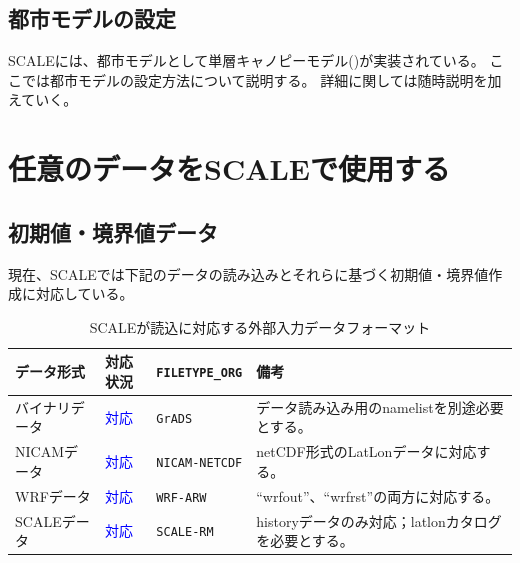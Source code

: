 \subsection{都市モデルの設定} \label{sec:adv_urban}
SCALEには、都市モデルとして単層キャノピーモデル(\cite{kusaka_2001})が実装されている。
ここでは都市モデルの設定方法について説明する。
詳細に関しては随時説明を加えていく。


\section{任意のデータをSCALEで使用する} \label{sec:adv_datainput}





\subsection{初期値・境界値データ} \label{sec:adv_bnddata}
現在、SCALEでは下記のデータの読み込みとそれらに基づく初期値・境界値作成に対応している。

\begin{table}[htb]
\begin{center}
\caption{SCALEが読込に対応する外部入力データフォーマット}
\begin{tabularx}{150mm}{|l|l|l|X|} \hline
 \rowcolor[gray]{0.9} データ形式 & 対応状況 & \verb|FILETYPE_ORG| & 備考 \\ \hline
 バイナリデータ & \textcolor{blue}{対応} & \verb|GrADS| & データ読み込み用のnamelistを別途必要とする。 \\ \hline
 NICAMデータ & \textcolor{blue}{対応} & \verb|NICAM-NETCDF| & netCDF形式のLatLonデータに対応する。 \\ \hline
 WRFデータ & \textcolor{blue}{対応} & \verb|WRF-ARW| & ``wrfout''、``wrfrst''の両方に対応する。 \\ \hline
 SCALEデータ & \textcolor{blue}{対応} & \verb|SCALE-RM| & historyデータのみ対応；latlonカタログを必要とする。 \\ \hline
\end{tabularx}
\label{tab:inputdata_format}
\end{center}
\end{table}

